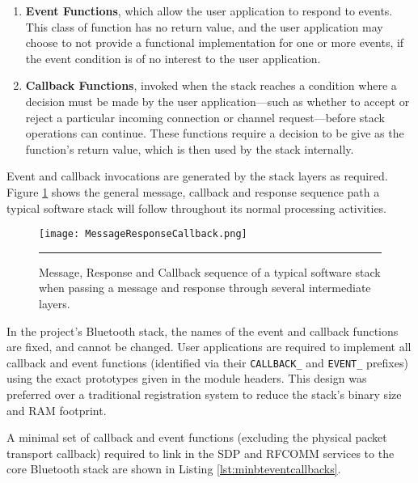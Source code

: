 \begin{enumerate}
	\item \textbf{Event Functions}, which allow the user application to respond to events. This class of function has no return value, and the user application may choose to not provide a functional implementation for one or more events, if the event condition is of no interest to the user application.
	\item \textbf{Callback Functions}, invoked when the stack reaches a condition where a decision must be made by the user application---such as whether to accept or reject a particular incoming connection or channel request---before stack operations can continue. These functions require a decision to be give as the function's return value, which is then used by the stack internally.
\end{enumerate}

Event and callback invocations are generated by the stack layers as required. Figure \ref{fig:messageresponsecallback} shows the general message, callback and response sequence path a typical software stack will follow throughout its normal processing activities.

\begin{figure}[tbph]
	\vspace{1em}
	\centering
		\texttt{[image: MessageResponseCallback.png]}
	\rule{35em}{0.5pt}
	\caption[Message, response and callback sequence]{Message, Response and Callback sequence of a typical software stack when passing a message and response through several intermediate layers.}
	\label{fig:messageresponsecallback}
\end{figure}

In the project's Bluetooth stack, the names of the event and callback functions are fixed, and cannot be changed. User applications are required to implement all callback and event functions (identified via their \lstinline{CALLBACK_} and \lstinline{EVENT_} prefixes) using the exact prototypes given in the module headers. This design was preferred over a traditional registration system to reduce the stack's binary size and RAM footprint.

A minimal set of callback and event functions (excluding the physical packet transport callback) required to link in the SDP and RFCOMM services to the core Bluetooth stack are shown in Listing \ref{lst:minbteventcallbacks}.


